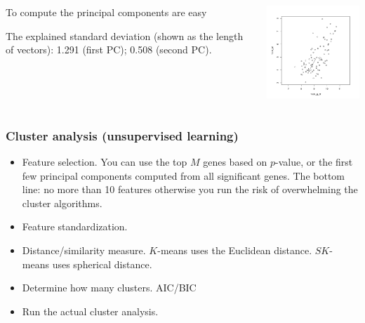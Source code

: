 \begin{frame}
  \begin{columns}
  \begin{column}{0.5\textwidth}
To compute the principal components are easy
\begin{knitrout}\footnotesize
{}\color{fgcolor}\begin{kframe}
\begin{alltt}
 \hlkwb{<-} 
\end{alltt}
\end{kframe}
\end{knitrout}
The explained standard deviation (shown as the length of vectors):  1.291 (first PC); 0.508 (second PC).
  \end{column}

  \begin{column}{0.5\textwidth}
    \includegraphics[width=2.5in]{results/pca}
  \end{column}
\end{columns}
\end{frame}




\begin{frame}
  \frametitle{Cluster analysis (unsupervised learning)}
  \begin{itemize}
  \item Feature selection. You can use the top $M$ genes based on
    $p$-value, or the first few principal components computed from all
    significant genes.  The bottom line: no more than 10 features
    otherwise you run the risk of overwhelming the cluster algorithms.
  \item Feature standardization.
  \item Distance/similarity measure. $K$-means uses the Euclidean
    distance. $SK$-means uses spherical distance.
  \item Determine how many clusters.  AIC/BIC
  \item Run the actual cluster analysis. 
  \end{itemize}
\end{frame}

